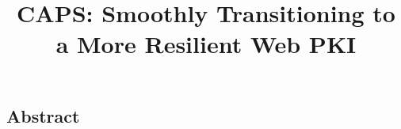 \documentclass[letterpaper,twocolumn,10pt]{article}
\begin{document}
\date{}

\title{
  \Large \bf
  CAPS: Smoothly Transitioning to a More Resilient Web PKI
}
\author{
}

\maketitle

\subsection*{Abstract}
















{\footnotesize 
}
\end{document}
